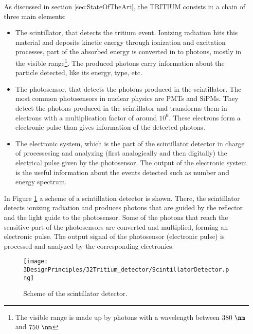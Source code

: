 As discussed in section \ref{sec:StateOfTheArt}, the TRITIUM consists in a chain of three main elements:

\begin{itemize}

\item{} The scintillator, that detects the tritium event. Ionizing radiation hits this material and deposits kinetic energy through ionization and excitation processes, part of the absorbed energy is converted in to photons, mostly in the visible range\footnote{The visible range is made up by photons with a wavelength between $380~\nm$ and $750~\nm$}. The produced photons carry information about the particle detected, like its energy, type, etc.

\item{} The photosensor, that detects the photons produced in the scintillator. The most common photosensors in nuclear physics are PMTs and SiPMs. They detect the photons produced in the scintillator and transforms them in electrons with a multiplication factor of around $10^6$. These electrons form a electronic pulse than gives information of the detected photons.

\item{} The electronic system, which is the part of the scintillator detector in charge of processesing and analyzing (first analogically and then digitally) the electrical pulse given by the photosensor. The output of the electronic system is the useful information about the events detected such as number and energy spectrum.

\end{itemize}

In Figure \ref{fig:ScintillatorDetector} a scheme of a scintillation detector is shown. There, the scintillator detects ionizing radiation and produces photons that are guided by the reflector and the light guide to the photosensor. Some of the photons that reach the sensitive part of the photosensors are converted and multiplied, forming an electronic pulse. The output signal of the photosensor (electronic pulse) is processed and analyzed by the corresponding electronics.

\begin{figure}[hbtp]
\texttt{[image: 3DesignPrinciples/32Tritium\_detector/ScintillatorDetector.png]}
\centering
\caption{Scheme of the scintillator detector.\label{fig:ScintillatorDetector}}
\end{figure}
